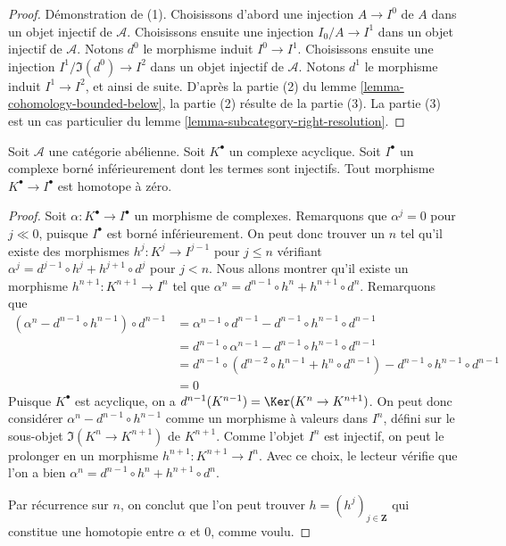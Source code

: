 \begin{proof}
Démonstration de (1). Choisissons d'abord une injection $A \to I^0$ de $A$
dans un objet injectif de $\mathcal{A}$. Choisissons ensuite une injection
$I_0/A \to I^1$ dans un objet injectif de $\mathcal{A}$. Notons $d^0$ le
morphisme induit $I^0 \to I^1$. Choisissons ensuite une injection
$I^1/\Im(d^0) \to I^2$ dans un objet injectif de $\mathcal{A}$. Notons $d^1$
le morphisme induit $I^1 \to I^2$, et ainsi de suite. D'après la partie (2) du
lemme \ref{lemma-cohomology-bounded-below}, la partie (2) résulte de la partie
(3). La partie (3) est un cas particulier du
lemme \ref{lemma-subcategory-right-resolution}.
\end{proof}

\begin{lemma}
\label{lemma-acyclic-is-zero}
Soit $\mathcal{A}$ une catégorie abélienne. Soit $K^\bullet$ un complexe
acyclique. Soit $I^\bullet$ un complexe borné inférieurement dont les termes
sont injectifs. Tout morphisme $K^\bullet \to I^\bullet$ est homotope à zéro.
\end{lemma}

\begin{proof}
Soit $\alpha : K^\bullet \to I^\bullet$ un morphisme de complexes. Remarquons
que $\alpha^j = 0$ pour $j \ll 0$, puisque $I^\bullet$ est borné
inférieurement. On peut donc trouver un $n$ tel qu'il existe des morphismes
$h^j :  K^j \to I^{j - 1}$ pour $j \leq n$ vérifiant
$\alpha^j = d^{j - 1} \circ h^j + h^{j + 1} \circ d^j$ pour $j < n$. Nous
allons montrer qu'il existe un morphisme
$h^{n + 1} : K^{n + 1} \to I^n$ tel que
$\alpha^n = d^{n - 1} \circ h^n + h^{n + 1} \circ d^n$. Remarquons que
\begin{align*}
(\alpha^n - d^{n - 1} \circ h^{n - 1}) \circ d^{n - 1}
& =
\alpha^{n - 1} \circ d^{n - 1} - d^{n - 1} \circ h^{n - 1} \circ d^{n - 1} \\
& =
d^{n - 1} \circ \alpha^{n - 1} - d^{n - 1} \circ h^{n - 1} \circ d^{n - 1} \\
& =
d^{n - 1} \circ (d^{n - 2} \circ h^{n - 1} + h^n \circ d^{n - 1})
- d^{n - 1} \circ h^{n - 1} \circ d^{n - 1} \\
& = 0
\end{align*}
Puisque $K^\bullet$ est acyclique, on a
$d^{n - 1}(K^{n - 1}) = \Ker(K^n \to K^{n + 1})$. On peut donc considérer
$\alpha^n -  d^{n - 1} \circ h^{n - 1}$ comme un morphisme à valeurs dans $I^n$,
défini sur le sous-objet $\Im(K^n \to K^{n + 1})$ de $K^{n + 1}$. Comme
l'objet $I^n$ est injectif, on peut le prolonger en un morphisme
$h^{n + 1} : K^{n + 1} \to I^n$. Avec ce choix, le lecteur vérifie que l'on a
bien $\alpha^n = d^{n - 1} \circ h^n + h^{n + 1} \circ d^n$.

\medskip\noindent
Par récurrence sur $n$, on conclut que l'on peut trouver
$h  = (h^j)_{j \in \mathbf{Z}}$ qui constitue une homotopie entre $\alpha$ et
$0$, comme voulu.
\end{proof}

